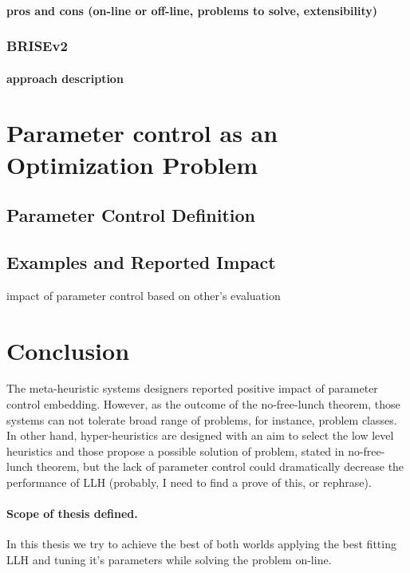\paragraph{pros and cons (on-line or off-line, problems to solve, extensibility)}\cite{autosklearn:feurer2015efficient}

\subsubsection{BRISEv2}
\paragraph{approach description}


\section{Parameter control as an Optimization Problem}\label{bg: parameter control}
\subsection{Parameter Control Definition}
\subsection{Examples and Reported Impact}
impact of parameter control based on other's evaluation


\section{Conclusion}

The meta-heuristic systems designers reported positive impact of parameter control embedding. 
However, as the outcome of the no-free-lunch theorem, those systems can not tolerate broad range of problems, for instance, problem classes.
In other hand, hyper-heuristics are designed with an aim to select the low level heuristics and those propose a possible solution of problem, stated in no-free-lunch theorem, but the lack of parameter control could dramatically decrease the performance of LLH (probably, I need to find a prove of this, or rephrase).

\paragraph{Scope of thesis defined.} In this thesis we try to achieve the best of both worlds applying the best fitting LLH and tuning it's parameters while solving the problem on-line.
